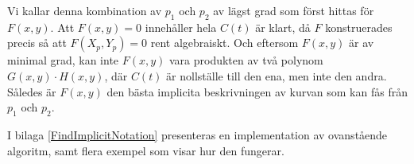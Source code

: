 Vi kallar denna kombination av $p_1$ och $p_2$ av lägst grad som först hittas för $F(x,y)$. Att $F(x,y)=0$ innehåller hela $C(t)$ är klart, då $F$ konstruerades precis så att $F(X_p,Y_p)=0$ rent algebraiskt. Och eftersom $F(x,y)$ är av minimal grad, kan inte $F(x,y)$ vara produkten av två polynom $G(x,y)\cdot H(x,y)$, där $C(t)$ är nollställe till den ena, men inte den andra. Således är $F(x,y)$ den bästa implicita beskrivningen av kurvan som kan fås från $p_1$ och $p_2$.

I bilaga \ref{FindImplicitNotation} presenteras en implementation av ovanstående algoritm, samt flera exempel som visar hur den fungerar.